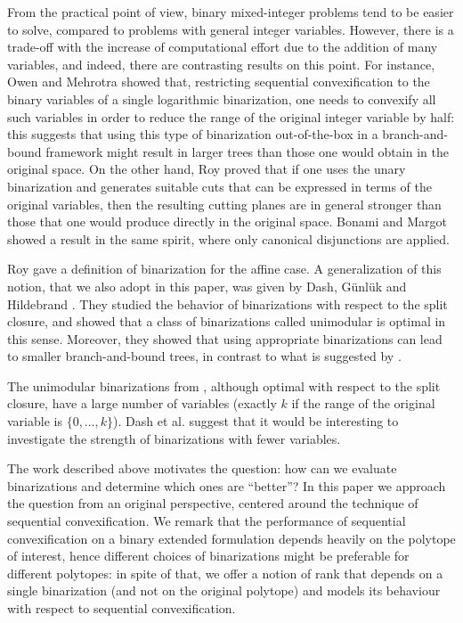 \documentclass[11pt,a4paper]{article}
\newcommand{\1}{\textbf{1}}
\begin{document}
From the practical point of view, binary mixed-integer problems tend to be easier to solve, compared to problems with general integer variables. However, there is a trade-off with the increase of computational effort due to the addition of many variables, and indeed, there are contrasting results on this point. For instance, Owen and Mehrotra \cite{owen2002value} showed that, restricting sequential convexification to the binary variables of a single logarithmic binarization, one needs to convexify all such variables in order to reduce the range of the original integer variable by half: this suggests that  using this type of binarization out-of-the-box in a branch-and-bound framework might result in larger trees than those one would obtain in the original space. 
On the other hand, Roy \cite{roy2007binarize} proved that if one uses the unary binarization and generates suitable cuts that can be expressed in terms of the original variables, then the resulting cutting planes are in general stronger than those that one would produce directly in the original space. Bonami and Margot \cite{bonami2015cut} showed a result in the same spirit, where only canonical disjunctions are applied.
\medskip

Roy \cite{roy2007binarize} gave a definition of binarization for the affine case. A generalization of this notion, that we also adopt in this paper, was given by Dash, G\"unl\"uk and Hildebrand \cite{dash2018binary}. They studied the behavior of binarizations with respect to the split closure, and showed that a class of binarizations called unimodular is optimal in this sense. Moreover, they showed that using appropriate binarizations can lead to smaller branch-and-bound trees, in contrast to what is suggested by \cite{owen2002value}. 

The unimodular binarizations from \cite{dash2018binary}, although optimal with respect to the split closure, have a large number of variables (exactly $k$ if the range of the original variable is $\{0,\dots,k\}$). Dash et al. \cite{dash2018binary} suggest that it would be interesting to investigate the strength of binarizations with fewer variables.
\medskip

The work described above motivates the question: how can we evaluate binarizations and determine which ones are ``better''? 
In this paper we approach the question from an original perspective, centered around the technique of sequential convexification. We remark that the performance of sequential convexification on a binary extended formulation depends heavily on the polytope of interest, hence different choices of binarizations might be preferable for different polytopes: 
in spite of that, we offer a notion of rank that depends on a single binarization (and not on the original polytope) and models its behaviour with respect to sequential convexification. 
\end{document}
